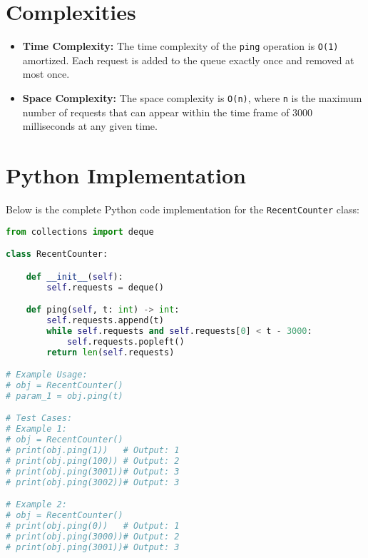 \section*{Complexities}

\begin{itemize}
    \item \textbf{Time Complexity:} The time complexity of the \texttt{ping} operation is \texttt{O(1)} amortized. Each request is added to the queue exactly once and removed at most once.
    \item \textbf{Space Complexity:} The space complexity is \texttt{O(n)}, where \texttt{n} is the maximum number of requests that can appear within the time frame of 3000 milliseconds at any given time.
\end{itemize}

\newpage %
\section*{Python Implementation}

Below is the complete Python code implementation for the \texttt{RecentCounter} class:

\begin{fullwidth}
\begin{lstlisting}[language=Python]
from collections import deque

class RecentCounter:

    def __init__(self):
        self.requests = deque()

    def ping(self, t: int) -> int:
        self.requests.append(t)
        while self.requests and self.requests[0] < t - 3000:
            self.requests.popleft()
        return len(self.requests)

# Example Usage:
# obj = RecentCounter()
# param_1 = obj.ping(t)

# Test Cases:
# Example 1:
# obj = RecentCounter()
# print(obj.ping(1))   # Output: 1
# print(obj.ping(100)) # Output: 2
# print(obj.ping(3001))# Output: 3
# print(obj.ping(3002))# Output: 3

# Example 2:
# obj = RecentCounter()
# print(obj.ping(0))   # Output: 1
# print(obj.ping(3000))# Output: 2
# print(obj.ping(3001))# Output: 3
\end{lstlisting}
\end{fullwidth}

